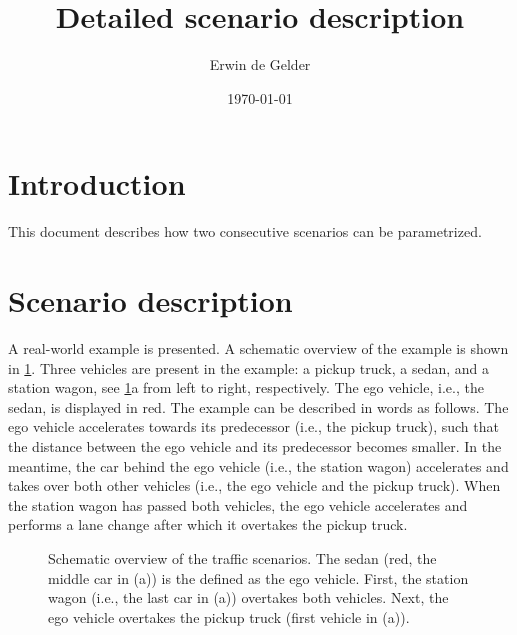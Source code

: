 \documentclass[10pt,final,a4paper,oneside,onecolumn]{article}
\def\reptitle{Detailed scenario description}
\def\repauthor{Erwin de Gelder}
\newlength\figurewidth
\newlength\figureheight
\theoremstyle{plain}\newtheorem{definition}{Definition}[section]    %
\theoremstyle{definition}\newtheorem{example}{Example}[section]     %
\theoremstyle{remark}\newtheorem{remarkenv}{Remark}[section]        %
\begin{document}

\title{\textbf{\reptitle}}
\author{\repauthor}
\date{\today}
\maketitle

\tableofcontents

\newpage

\section{Introduction}
\label{sec:introduction}

This document describes how two consecutive scenarios can be parametrized.


\section{Scenario description}

A real-world example is presented. A schematic overview of the example is shown in \cref{fig:example schematic}. Three vehicles are present in the example: a pickup truck, a sedan, and a station wagon, see \cref{fig:example schematic}a from left to right, respectively. The ego vehicle, i.e., the sedan, is displayed in red. The example can be described in words as follows. The ego vehicle accelerates towards its predecessor (i.e., the pickup truck), such that the distance between the ego vehicle and its predecessor becomes smaller. In the meantime, the car behind the ego vehicle (i.e., the station wagon) accelerates and takes over both other vehicles (i.e., the ego vehicle and the pickup truck). When the station wagon has passed both vehicles, the ego vehicle accelerates and performs a lane change after which it overtakes the pickup truck.

\setlength\figureheight{106pt}
\setlength\figurewidth{260pt}
\begin{figure}[b]
	\begin{minipage}[b]{\linewidth}
		\centering
	\end{minipage}
	\setlength\figureheight{100pt}
	\begin{minipage}[b]{\linewidth}
		\centering
	\end{minipage}
	\caption{Schematic overview of the traffic scenarios. The sedan (red, the middle car in (a)) is the defined as the ego vehicle. First, the station wagon (i.e., the last car in (a)) overtakes both vehicles. Next, the ego vehicle overtakes the pickup truck (first vehicle in (a)).}
	\label{fig:example schematic}
\end{figure}
\end{document}
